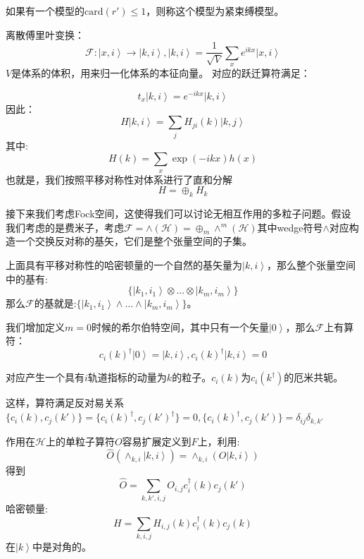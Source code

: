 \documentclass[supercite]{HustGraduPaper}
\newcommand{\ket}[1]{\left| #1 \right\rangle}
\begin{document}
如果有一个模型的$\text{card}(r') \le 1$，则称这个模型为紧束缚模型。

离散傅里叶变换：
\begin{equation}
\mathcal{F}: \ket{x,i} \to \ket{k,i}, \ket{k,i} = \frac{1}{\sqrt{V}}\sum_x e^{ikx}\ket{x,i}
\end{equation}
$V$是体系的体积，用来归一化体系的本征向量。
对应的跃迁算符满足：

\begin{equation}
t_x \ket{k,i} = e^{-ikx}\ket{k,i}
\end{equation}
因此：
\begin{equation}
H\ket{k,i} = \sum_j H_{ji}(k)\ket{k,j}
\end{equation}
其中:
\begin{equation}
H(k) = \sum_x \exp(-ikx)h(x)
\end{equation}
也就是，我们按照平移对称性对体系进行了直和分解\begin{equation}
H = \oplus_k H_k
\end{equation}

接下来我们考虑Fock空间，这使得我们可以讨论无相互作用的多粒子问题。假设我们考虑的是费米子，考虑$\mathcal{F} = \wedge(\mathcal{H}) = \oplus_m \wedge^m(\mathcal{H})$其中wedge符号$\wedge$对应构造一个交换反对称的基矢，它们是整个张量空间的子集。

上面具有平移对称性的哈密顿量的一个自然的基矢量为$\ket{k,i}$，那么整个张量空间中的基有:
\begin{equation}
\{ \ket{k_1,i_1}\otimes\ldots \otimes \ket{k_m,i_m} \}
\end{equation}
那么$\mathcal{F}$的基就是:$\{\ket{k_1,i_1}\wedge \ldots \wedge \ket{k_m,i_m}\}$。

我们增加定义$m = 0$时候的希尔伯特空间，其中只有一个矢量$\ket{0}$，那么$\mathcal{F}$上有算符：
\begin{equation}
c_i(k)^\dagger \ket{0} = \ket{k,i}, c_i(k)^\dagger \ket{k,i} = 0
\end{equation}


对应产生一个具有$i$轨道指标的动量为$k$的粒子。$c_i(k)$为$c_i(k^\dagger)$的厄米共轭。

这样，算符满足反对易关系$\{c_i(k),c_j(k')\} = \{c_i(k)^\dagger,c_j(k')^\dagger\}  = 0, \{c_i(k)^\dagger,c_j(k')\} = \delta_{ij} \delta_{k,k'}$

作用在$\mathcal{H}$上的单粒子算符$O$容易扩展定义到$F$上，利用:
\begin{equation}
\hat{O} (\wedge_{k,i} \ket{k,i}) = \wedge_{k,i}(O\ket{k,i})
\end{equation}
得到
\begin{equation}
\hat{O} = \sum_{k,k',i,j} O_{i,j}c_i^{\dagger}(k) c_j(k')
\end{equation}
哈密顿量:
\begin{equation}
H = \sum_{k,i,j}H_{i,j}(k) c_i^\dagger(k) c_j(k)
\end{equation}
在$\ket{k}$中是对角的。
\end{document}
